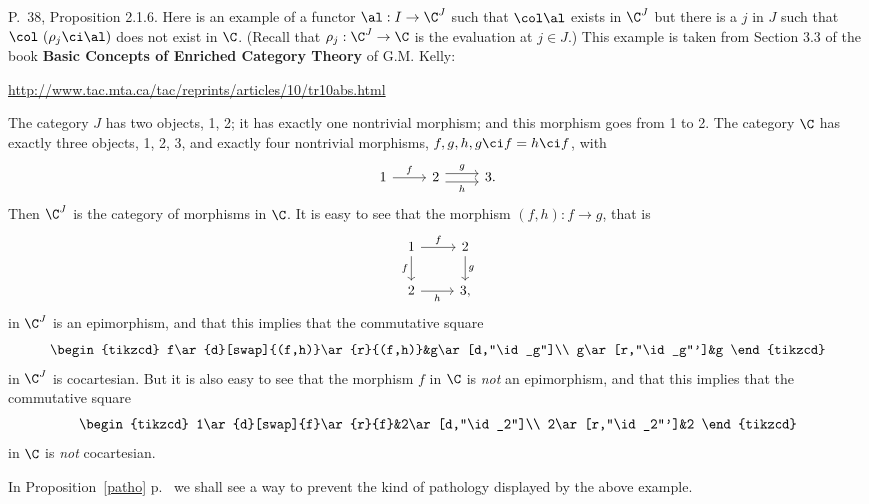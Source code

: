 \documentclass[12pt]{article}
\theoremstyle{remark}
\theoremstyle{definition}
\begin{document}
%

\begin{s}
P.~38, Proposition 2.1.6. Here is an example of a functor $\al:I\to\C^J$ such that $\col\al$ exists in $\C^J$ but there is a $j$ in $J$ such that $\col\ (\rho_j\ci\al)$ does not exist in $\C$. (Recall that $\rho_j:\C^J\to\C$ is the evaluation at $j\in J$.) This example is taken from Section 3.3 of the book \textbf{Basic Concepts of Enriched Category Theory} of G.M. Kelly:%
%
\begin{center}\href{http://www.tac.mta.ca/tac/reprints/articles/10/tr10abs.html}{http://www.tac.mta.ca/tac/reprints/articles/10/tr10abs.html}
\end{center}

The category $J$ has two objects, 1, 2; it has exactly one nontrivial morphism; and this morphism goes from 1 to 2. The category $\C$ has exactly three objects, 1, 2, 3, and exactly four nontrivial morphisms, $f,g,h,g\ci f=h\ci f$, with 
$$
\begin{tikzcd}
1\ar{r}{f}&2\ar[yshift=.7ex]{r}{g}\ar[yshift=-.7ex]{r}[swap]{h}&3.
\end{tikzcd}
$$ 
Then $\C^J$ is the category of morphisms in $\C$. It is easy to see that the morphism $(f,h):f\to g$, %
that is 
$$
\begin{tikzcd}
1\ar[d,"f"']\ar[r,"f"]&2\ar[d,"g"]\\ 
2\ar[r,"h"']&3,
\end{tikzcd}
$$
in $\C^J$ is an epimorphism, and that this implies that the commutative square 
$$
\begin{tikzcd}
f\ar{d}[swap]{(f,h)}\ar{r}{(f,h)}&g\ar[d,"\id_g"]\\ 
g\ar[r,"\id_g"']&g
\end{tikzcd}
$$ 
in $\C^J$ is cocartesian. But it is also easy to see that the morphism $f$ in $\C$ is \emph{not} an epimorphism, and that this implies that the commutative square 
$$
\begin{tikzcd}
1\ar{d}[swap]{f}\ar{r}{f}&2\ar[d,"\id_2"]\\ 
2\ar[r,"\id_2"']&2
\end{tikzcd}
$$ 
in $\C$ is \emph{not} cocartesian. %

In Proposition~\ref{patho} p.~ we shall see a way to prevent the kind of pathology displayed by the above example.
\end{s}
\end{document}
